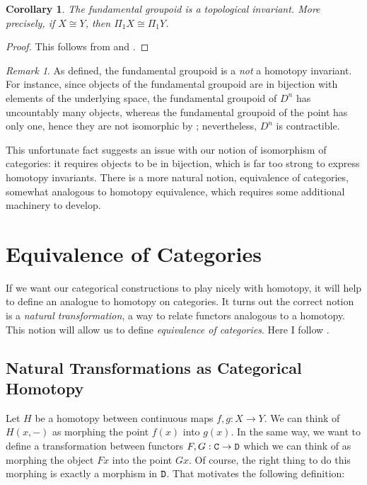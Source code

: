 \documentclass[11 pt]{amsart}
\theoremstyle{plain}   %
\newtheorem{cor}{Corollary}[section]
\theoremstyle{definition}
\theoremstyle{remark}
\newtheorem{rem}{Remark}[section]
\numberwithin{equation}{section}
\newcommand{\cat}[1]{{\normalfont\texttt{#1}}}
\begin{document}
\begin{cor}\label{fundamental groupoid is topological}
	The fundamental groupoid is a topological invariant. More precisely, if
	$X\cong Y$, then $\Pi_1X\cong \Pi_1Y$.
\end{cor}

\begin{proof}
	This follows from  and .
\end{proof}

\begin{rem}\label{fundamental groupoid is not homotopy invariant} As defined,
	the fundamental groupoid is a \emph{not} a homotopy invariant. For instance,
	since objects of the fundamental groupoid are in bijection with elements of
	the underlying space, the fundamental groupoid of $D^n$ has uncountably many
	objects, whereas the fundamental groupoid of the point has only one, hence
	they are not isomorphic by ; nevertheless,
	$D^n$ is contractible. \end{rem}

This unfortunate fact suggests an issue with our notion of isomorphism of
categories: it requires objects to be in bijection, which is far too strong to
express homotopy invariants. There is a more natural notion, equivalence of
categories, somewhat analogous to homotopy equivalence, which requires some
additional machinery to develop.

\section{Equivalence of Categories}
\label{natural transformations}

If we want our categorical constructions to play nicely with homotopy, it will
help to define an analogue to homotopy on categories. It turns out the correct
notion is a \emph{natural transformation}, a way to relate functors analogous to
a homotopy. This notion will allow us to define \emph{equivalence of
	categories}. Here I follow \cite[Sections 1.4-1.7]{Riehl}.

\subsection{Natural Transformations as Categorical Homotopy}

Let $H$ be a homotopy between continuous maps $f,g: X\rightarrow Y$. We can think
of $H(x, -)$ as morphing the point $f(x)$ into $g(x)$. In the same way, we want to define
a transformation between functors $F,G: \cat{C}\rightarrow\cat{D}$ which we can
think of as morphing the object $Fx$ into the point $Gx$. Of course, the right
thing to do this morphing is exactly a morphism in $\cat{D}$. That motivates the
following definition:
\end{document}
